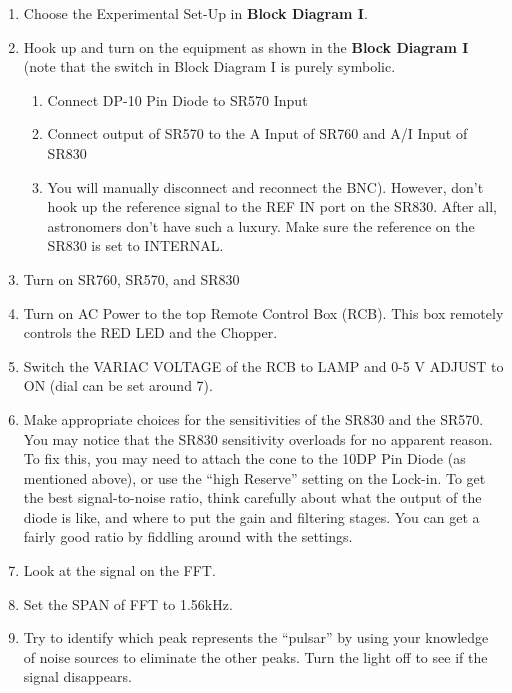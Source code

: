 \documentclass{../lab}
\begin{document}
\begin{enumerate}
    \item Choose the Experimental Set-Up in \textbf{Block Diagram I}.

    \item Hook up and turn on the equipment as shown in the \textbf{Block Diagram I} (note that the switch in Block Diagram I is purely symbolic.
    \begin{enumerate}
        \item Connect DP-10 Pin Diode to SR570 Input

        \item Connect output of SR570 to the A Input of SR760 and A/I Input of SR830

        \item You will manually disconnect and reconnect the BNC). However, don't hook up the reference signal to the REF IN port on the SR830. After all, astronomers don't have such a luxury. Make sure the reference on the SR830 is set to INTERNAL.
    \end{enumerate}

    \item Turn on SR760, SR570, and SR830

    \item Turn on AC Power to the top Remote Control Box (RCB). This box remotely controls the RED LED and the Chopper.

    \item Switch the VARIAC VOLTAGE of the RCB to LAMP and 0-5 V ADJUST to ON (dial can be set around 7).

    \item Make appropriate choices for the sensitivities of the SR830 and the SR570. You may notice that the SR830 sensitivity overloads for no apparent reason. To fix this, you may need to attach the cone to the 10DP Pin Diode (as mentioned above), or use the ``high Reserve'' setting on the Lock-in. To get the best signal-to-noise ratio, think carefully about what the output of the diode is like, and where to put the gain and filtering stages. You can get a fairly good ratio by fiddling around with the settings.

    \item Look at the signal on the FFT.

    \item Set the SPAN of FFT to 1.56kHz.

    \item Try to identify which peak represents the ``pulsar'' by using your knowledge of noise sources to eliminate the other peaks. Turn the light off to see if the signal disappears.


\end{enumerate}
\end{document}
